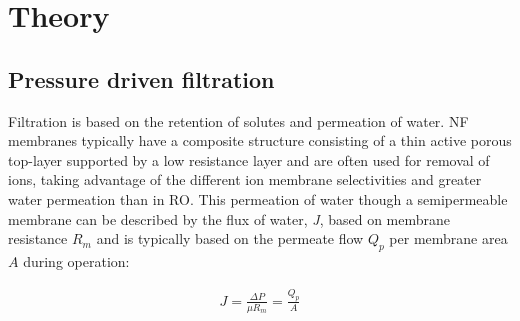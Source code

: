 \chapter{Theory}






\section{Pressure driven filtration}
Filtration  is based on the retention of solutes and permeation of water.
NF membranes typically have a composite structure consisting of a thin active porous top-layer supported by a low resistance layer and are often used for removal of ions, taking advantage of the different ion membrane selectivities and greater water permeation than in RO.
This permeation of water though a semipermeable membrane can be described by the flux of water, \textit{J}, based on membrane resistance \textit{$R_m$} and is typically based on the permeate flow $Q_p$ per membrane area $A$ during operation:
\begin{ceqn}
    \begin{align}
        J=\frac{\Delta P}{\mu R_m}=\frac{Q_p}{A}
    \end{align}
\end{ceqn}



